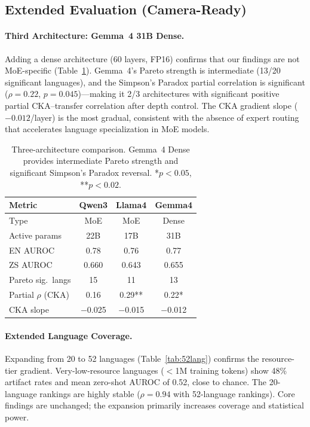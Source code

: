 \documentclass[11pt,a4paper]{article}
\newcommand{\auroc}{AUROC}
\begin{document}
\subsection{Extended Evaluation (Camera-Ready)}
\label{sec:extensions}

\paragraph{Third Architecture: Gemma~4 31B Dense.}
Adding a dense architecture (60 layers, FP16) confirms that our findings are not MoE-specific (Table~\ref{tab:three_arch}). Gemma~4's Pareto strength is intermediate (13/20 significant languages), and the Simpson's Paradox partial correlation is significant ($\rho=0.22$, $p=0.045$)---making it 2/3 architectures with significant positive partial CKA--transfer correlation after depth control. The CKA gradient slope ($-0.012$/layer) is the most gradual, consistent with the absence of expert routing that accelerates language specialization in MoE models.

\begin{table}[t]
\centering
\small
\begin{tabular}{lccc}
\toprule
Metric & Qwen3 & Llama4 & Gemma4 \\
\midrule
Type & MoE & MoE & Dense \\
Active params & 22B & 17B & 31B \\
EN \auroc{} & 0.78 & 0.76 & 0.77 \\
ZS \auroc{} & 0.660 & 0.643 & 0.655 \\
Pareto sig.\ langs & 15 & 11 & 13 \\
Partial $\rho$ (CKA) & 0.16 & 0.29** & 0.22* \\
CKA slope & $-$0.025 & $-$0.015 & $-$0.012 \\
\bottomrule
\end{tabular}
\caption{Three-architecture comparison. Gemma~4 Dense provides intermediate Pareto strength and significant Simpson's Paradox reversal. *$p<0.05$, **$p<0.02$.}
\label{tab:three_arch}
\end{table}

\paragraph{Extended Language Coverage.}
Expanding from 20 to 52 languages (Table~\ref{tab:52lang}) confirms the resource-tier gradient. Very-low-resource languages ($<$1M training tokens) show 48\% artifact rates and mean zero-shot \auroc{} of 0.52, close to chance. The 20-language rankings are highly stable ($\rho=0.94$ with 52-language rankings). Core findings are unchanged; the expansion primarily increases coverage and statistical power.
\end{document}
